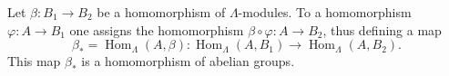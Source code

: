 Let $\beta \colon B_1 \to B_2$ be a homomorphism of $\Lambda$-modules. To a homomorphism $\varphi \colon A \to B_1$ one assigns the homomorphism $\beta \circ \varphi \colon A \to B_2$, thus defining a map
$$
\beta_{*} = \operatorname{Hom}_{\Lambda}(A, \beta) \colon \operatorname{Hom}_{\Lambda}(A, B_1) \longrightarrow \operatorname{Hom}_{\Lambda}(A, B_2).
$$
This map $\beta_{*}$ is a homomorphism of abelian groups.

